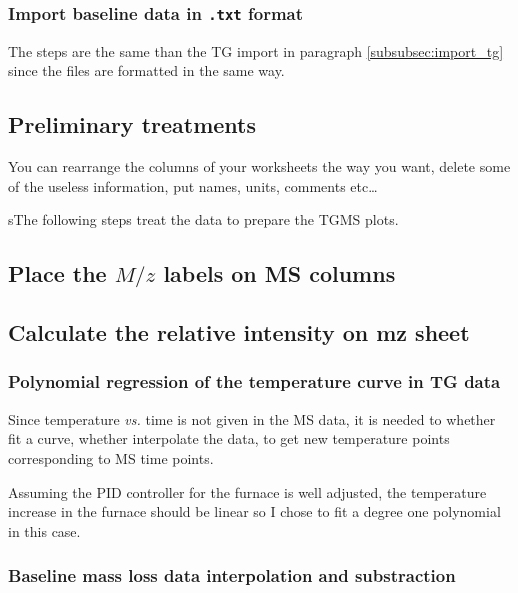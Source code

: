\documentclass[a4paper, 11pt, raggedright, parskip]{tufte-style-article}
\begin{document}
\subsubsection{Import baseline data in \texttt{.txt} format}

The steps are the same than the TG import in paragraph \ref{subsubsec:import_tg} since the files are formatted in the same way.


\subsection{Preliminary treatments}

You can rearrange the columns of your worksheets the way you want, delete some of the useless information, put names, units, comments etc\dots{}

sThe following steps treat the data to prepare the TGMS plots.


\subsection{Place the $M/z$ labels on MS columns}


\subsection{Calculate the relative intensity on mz sheet}


\subsubsection{Polynomial regression of the temperature curve in TG data}

Since temperature \textit{vs.} time is not given in the MS data, it is needed to whether fit a curve, whether interpolate the data, to get new temperature points corresponding to MS time points.
 
Assuming the {\lsstyle PID} controller for the furnace is well adjusted, the temperature increase in the furnace should be linear so I chose to fit a degree one polynomial in this case.


\subsubsection[Baseline mass loss data interpolation and substraction]{Baseline mass loss data interpolation and substraction}
\end{document}
